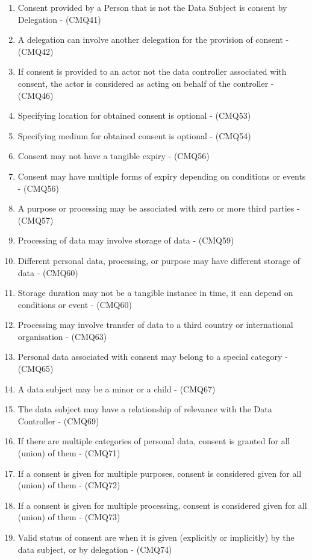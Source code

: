 \begin{enumerate}[label={\textit{A.\theenumi}}]
    \item Consent provided by a Person that is not the Data Subject is consent by Delegation - (CMQ41)
    \item A delegation can involve another delegation for the provision of consent - (CMQ42)
    \item If consent is provided to an actor not the data controller associated with consent, the actor is considered as acting on behalf of the controller - (CMQ46)
    \item Specifying location for obtained consent is optional - (CMQ53)
    \item Specifying medium for obtained consent is optional - (CMQ54)
    \item Consent may not have a tangible expiry - (CMQ56)
    \item Consent may have multiple forms of expiry depending on conditions or events - (CMQ56)
    \item A purpose or processing may be associated with zero or more third parties - (CMQ57)
    \item Processing of data may involve storage of data - (CMQ59)
    \item Different personal data, processing, or purpose may have different storage of data - (CMQ60)
    \item Storage duration may not be a tangible instance in time, it can depend on conditions or event - (CMQ60)
    \item Processing may involve transfer of data to a third country or international organisation - (CMQ63)
    \item Personal data associated with consent may belong to a special category - (CMQ65)
    \item A data subject may be a minor or a child - (CMQ67)
    \item The data subject may have a relationship of relevance with the Data Controller - (CMQ69)
    \item If there are multiple categories of personal data, consent is granted for all (union) of them - (CMQ71)
    \item If a consent is given for multiple purposes, consent is considered given for all (union) of them - (CMQ72)
    \item If a consent is given for multiple processing, consent is considered given for all (union) of them - (CMQ73)
    \item Valid status of consent are when it is given (explicitly or implicitly) by the data subject, or by delegation - (CMQ74)

\end{enumerate}
